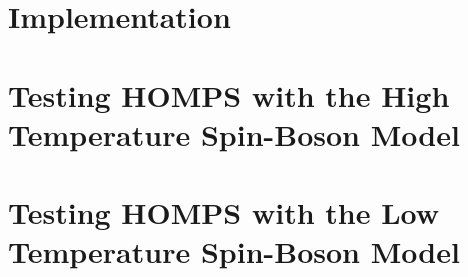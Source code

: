 \section{Implementation}

\newpage
\section{Testing HOMPS with the High Temperature Spin-Boson Model}

\newpage
\section{Testing HOMPS with the Low Temperature Spin-Boson Model}
